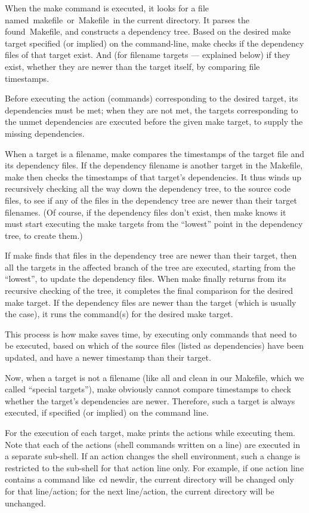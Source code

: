 \documentclass[12pt]{article}
\begin{document}
When the make command is executed, it looks for a file named makefile or Makefile in the current directory. It parses the found Makefile, and constructs a dependency tree. Based on the desired make target specified (or implied) on the command-line, make checks if the dependency files of that target exist. And (for filename targets — explained below) if they exist, whether they are newer than the target itself, by comparing file timestamps.

Before executing the action (commands) corresponding to the desired target, its dependencies must be met; when they are not met, the targets corresponding to the unmet dependencies are executed before the given make target, to supply the missing dependencies.

When a target is a filename, make compares the timestamps of the target file and its dependency files. If the dependency filename is another target in the Makefile, make then checks the timestamps of that target’s dependencies. It thus winds up recursively checking all the way down the dependency tree, to the source code files, to see if any of the files in the dependency tree are newer than their target filenames. (Of course, if the dependency files don’t exist, then make knows it must start executing the make targets from the “lowest” point in the dependency tree, to create them.)

If make finds that files in the dependency tree are newer than their target, then all the targets in the affected branch of the tree are executed, starting from the “lowest”, to update the dependency files. When make finally returns from its recursive checking of the tree, it completes the final comparison for the desired make target. If the dependency files are newer than the target (which is usually the case), it runs the command(s) for the desired make target.

This process is how make saves time, by executing only commands that need to be executed, based on which of the source files (listed as dependencies) have been updated, and have a newer timestamp than their target.

Now, when a target is not a filename (like all and clean in our Makefile, which we called “special targets”), make obviously cannot compare timestamps to check whether the target’s dependencies are newer. Therefore, such a target is always executed, if specified (or implied) on the command line.

For the execution of each target, make prints the actions while executing them. Note that each of the actions (shell commands written on a line) are executed in a separate sub-shell. If an action changes the shell environment, such a change is restricted to the sub-shell for that action line only. For example, if one action line contains a command like cd newdir, the current directory will be changed only for that line/action; for the next line/action, the current directory will be unchanged.
\end{document}

